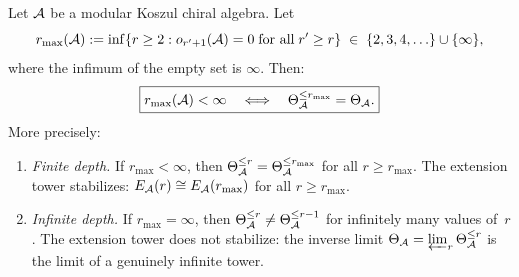 \begin{theorem}
\label{thm:shadow-depth-dichotomy}
Let $\mathcal{A}$ be a modular Koszul chiral algebra. Let
\begin{equation}\label{eq:shadow-depth-definition-recall}
r_{\max}(\mathcal{A}) :=
\inf\{r \geq 2 : o_{r'+1}(\mathcal{A}) = 0
\;\text{for all}\; r' \geq r\}
\;\in\; \{2, 3, 4, \ldots\} \cup \{\infty\},
\end{equation}
where the infimum of the empty set is $\infty$.
Then:
\begin{equation}\label{eq:dichotomy-equivalence}
\boxed{
r_{\max}(\mathcal{A}) < \infty
\quad\Longleftrightarrow\quad
\Theta_{\mathcal{A}}^{\leq r_{\max}} = \Theta_{\mathcal{A}}.
}
\end{equation}
More precisely:
\begin{enumerate}[label=\textup{(\roman*)}]
\item \emph{Finite depth.}
If $r_{\max} < \infty$, then
$\Theta_{\mathcal{A}}^{\leq r} = \Theta_{\mathcal{A}}^{\leq r_{\max}}$
for all $r \geq r_{\max}$. The extension tower
stabilizes: $E_{\mathcal{A}}(r) \cong E_{\mathcal{A}}(r_{\max})$ for all
$r \geq r_{\max}$.

\item \emph{Infinite depth.}
If $r_{\max} = \infty$, then
$\Theta_{\mathcal{A}}^{\leq r} \neq \Theta_{\mathcal{A}}^{\leq r-1}$
for infinitely many values of~$r$. The extension
tower does not stabilize: the inverse limit
$\Theta_{\mathcal{A}} = \varprojlim_r \Theta_{\mathcal{A}}^{\leq r}$
is the limit of a genuinely infinite tower.
\end{enumerate}
\end{theorem}

